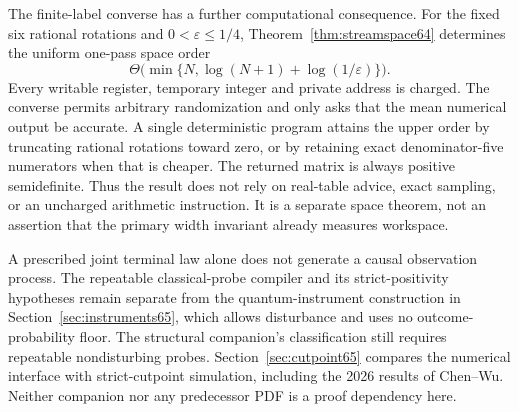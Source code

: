 The finite-label converse has a further computational consequence.
For the fixed six rational rotations and $0<\varepsilon\le1/4$,
Theorem~\ref{thm:streamspace64}
determines the uniform one-pass space order
\[
 \Theta\bigl(\min\{N,\log(N+1)+\log(1/\varepsilon)\}\bigr).
\]
Every writable register, temporary integer and private address is charged.
The converse permits arbitrary randomization and only asks that the mean
numerical output be accurate. A single deterministic program attains
the upper order by truncating rational rotations toward zero, or by
retaining exact denominator-five numerators when that is cheaper.
The returned matrix is always positive semidefinite. Thus the result
does not rely on real-table advice, exact sampling, or an uncharged
arithmetic instruction. It is a separate space theorem, not an assertion
that the primary width invariant already measures workspace.

A prescribed joint terminal law alone does not generate a causal
observation process. The repeatable classical-probe compiler and its
strict-positivity hypotheses remain separate from the quantum-instrument
construction in Section~\ref{sec:instruments65}, which allows disturbance
and uses no outcome-probability floor. The structural companion's
classification still requires repeatable nondisturbing probes.
Section~\ref{sec:cutpoint65} compares the numerical interface with
strict-cutpoint simulation, including the 2026 results of Chen--Wu.
Neither companion nor any predecessor PDF is a proof dependency here.
